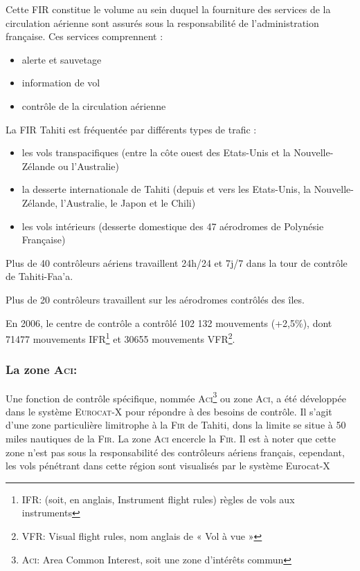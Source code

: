 Cette FIR constitue le volume au sein duquel la fourniture des services de la circulation aérienne sont assurés sous la responsabilité de l'administration française. Ces services comprennent :
\begin{itemize}
    \item alerte et sauvetage
    \item information de vol
    \item contrôle de la circulation aérienne
\end{itemize}\medskip
La FIR Tahiti est fréquentée par différents types de trafic :
\begin{itemize}
    \item les vols transpacifiques (entre la côte ouest des Etats-Unis et la Nouvelle-Zélande ou l'Australie)
    \item la desserte internationale de Tahiti (depuis et vers les Etats-Unis, la Nouvelle-Zélande, l'Australie, le Japon et le Chili)
    \item les vols intérieurs (desserte domestique des 47 aérodromes de Polynésie Française)
\end{itemize}\medskip

Plus de 40 contrôleurs aériens travaillent 24h/24 et 7j/7 dans la tour de contrôle de Tahiti-Faa'a.

Plus de 20 contrôleurs travaillent sur les aérodromes contrôlés des îles.

En 2006, le centre de contrôle a contrôlé 102 132 mouvements (+2,5\%), dont 71477 mouvements \textsc{IFR}\footnote{IFR: (soit, en anglais, Instrument flight rules) règles de vols aux instruments} et 30655 mouvements \textsc{VFR}\footnote{VFR: Visual flight rules, nom anglais de « Vol à vue »}.

        \subsubsection{La zone \textsc{Aci}:\label{Aci}}
Une fonction de contrôle spécifique, nommée \textsc{Aci}\footnote{\textsc{Aci}: Area Common Interest, soit une zone d'intérêts commun} ou zone \textsc{Aci}, a été développée dans le système \textsc{Eurocat-X} pour répondre à des besoins de contrôle. Il s’agit d’une zone particulière limitrophe à la \textsc{Fir}  de Tahiti, dons la limite se situe à 50 miles nautiques de la \textsc{Fir}. La zone \textsc{Aci} encercle la \textsc{Fir}. Il est à noter que cette zone n’est pas sous la responsabilité des contrôleurs aériens français, cependant, les vols pénétrant dans cette région sont visualisés par le système Eurocat-X 

